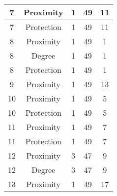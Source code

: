 \documentclass[results.tex]{subfiles}
\begin{document}
\begin{center}
\begin{tabular}{| c || c | c | c | c |}
            \hline
            7                       & Proximity                    & 1                      & 49                      & 11                   \\
            \hline
            7                       & Protection                   & 1                      & 49                      & 11                   \\
            \hline
            8                       & Proximity                    & 1                      & 49                      & 1                    \\
            \hline
            8                       & Degree                       & 1                      & 49                      & 1                    \\
            \hline
            8                       & Protection                   & 1                      & 49                      & 1                    \\
            \hline
            9                       & Proximity                    & 1                      & 49                      & 13                   \\
            \hline
            10                      & Proximity                    & 1                      & 49                      & 5                    \\
            \hline
            10                      & Protection                   & 1                      & 49                      & 5                    \\
            \hline
            11                      & Proximity                    & 1                      & 49                      & 7                    \\
            \hline
            11                      & Protection                   & 1                      & 49                      & 7                    \\
            \hline
            12                      & Proximity                    & 3                      & 47                      & 9                    \\
            \hline
            12                      & Degree                       & 3                      & 47                      & 9                    \\
            \hline
            13                      & Proximity                    & 1                      & 49                      & 17                   \\

\end{tabular}
\end{center}
\end{document}
